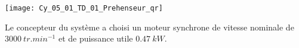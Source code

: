 \ifprof
\else
\begin{marginfigure}
\centering
\texttt{[image: Cy\_05\_01\_TD\_01\_Prehenseur\_qr]}
\end{marginfigure}
\fi

Le concepteur du système a choisi un moteur synchrone de vitesse nominale de $\SI{3000}{tr.min^{-1}}$ et de puissance utile $\SI{0,47}{kW}$.

\ifprof
\begin{corrige}~\\
\end{corrige}
\else
\fi

